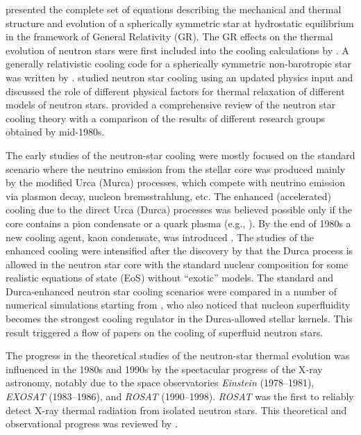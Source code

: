 \documentclass[smallextended]{svjour3}       %
\begin{document}
\citet{Thorne77} presented the complete set of equations describing the
mechanical and thermal structure and evolution of a spherically
symmetric star at hydrostatic equilibrium in the framework of General
Relativity (GR). The GR effects on the thermal evolution of neutron
stars were first included into the cooling calculations by
\citet{GlenSutherland80,NomotoTsuruta81b,VanRiperLamb81}. A generally
relativistic cooling code for a spherically symmetric non-barotropic
star was written by \citet{Richardson-ea82}.
\citet{NomotoTsuruta86,NomotoTsuruta87} studied neutron star cooling
using an updated physics input and  discussed the role of different
physical factors for thermal relaxation of different models of neutron
stars. \citet{Tsuruta86} provided a comprehensive review of the neutron
star cooling theory with a comparison of the results of different
research groups obtained by mid-1980s.

The early studies of the neutron-star cooling were mostly focused on the
standard scenario where the neutrino emission from the stellar core was
produced mainly by the modified Urca (Murca) processes, which compete
with neutrino emission via plasmon decay, nucleon bremsstrahlung, etc.
The enhanced (accelerated) cooling due to the direct Urca (Durca)
processes was believed possible only if the core contains a pion
condensate or a quark plasma (e.g.,
\citealp{Tsuruta79,GlenSutherland80,VanRiperLamb81,Richardson-ea82}). 
By the end of 1980s a new cooling agent, kaon condensate, was introduced
\citep{Brown-ea88,PageBaron90}. The studies of the enhanced cooling were
intensified after the discovery by \citet{Lattimer-ea91} that the Durca
process is allowed in the neutron star core with the standard nuclear
composition for some realistic equations of state (EoS) without
``exotic'' models. The standard and  Durca-enhanced neutron star cooling
scenarios were compared in a number of numerical simulations starting
from \citet{PageApplegate92}, who also noticed that nucleon
superfluidity becomes the strongest  cooling regulator in the
Durca-allowed stellar kernels. This result triggered a flow of papers on
the cooling of superfluid neutron stars.

The progress in the theoretical studies of the neutron-star
thermal evolution was influenced in the 1980s and 1990s by
the spectacular progress of the X-ray astronomy, notably due
to the space observatories \textit{Einstein} (1978--1981),
\textit{EXOSAT} (1983--1986), and \textit{ROSAT}
(1990--1998). \textit{ROSAT} was the first to reliably
detect X-ray thermal radiation from isolated neutron stars.
This theoretical and observational progress was reviewed by
\citet{Tsuruta98,YakovlevPethick04,Pageetal2004}.
\end{document}
